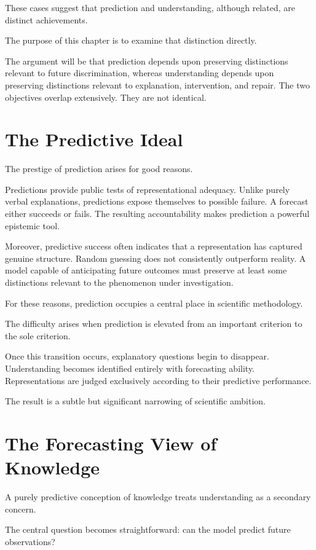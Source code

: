 \documentclass[11pt,oneside,openany]{book}
\begin{document}
These cases suggest that prediction and understanding, although related, are distinct achievements.

The purpose of this chapter is to examine that distinction directly.

The argument will be that prediction depends upon preserving distinctions relevant to future discrimination, whereas understanding depends upon preserving distinctions relevant to explanation, intervention, and repair. The two objectives overlap extensively. They are not identical.

\section{The Predictive Ideal}

The prestige of prediction arises for good reasons.

Predictions provide public tests of representational adequacy. Unlike purely verbal explanations, predictions expose themselves to possible failure. A forecast either succeeds or fails. The resulting accountability makes prediction a powerful epistemic tool.

Moreover, predictive success often indicates that a representation has captured genuine structure. Random guessing does not consistently outperform reality. A model capable of anticipating future outcomes must preserve at least some distinctions relevant to the phenomenon under investigation.

For these reasons, prediction occupies a central place in scientific methodology.

The difficulty arises when prediction is elevated from an important criterion to the sole criterion.

Once this transition occurs, explanatory questions begin to disappear. Understanding becomes identified entirely with forecasting ability. Representations are judged exclusively according to their predictive performance.

The result is a subtle but significant narrowing of scientific ambition.

\section{The Forecasting View of Knowledge}

A purely predictive conception of knowledge treats understanding as a secondary concern.

The central question becomes straightforward: can the model predict future observations?
\end{document}
